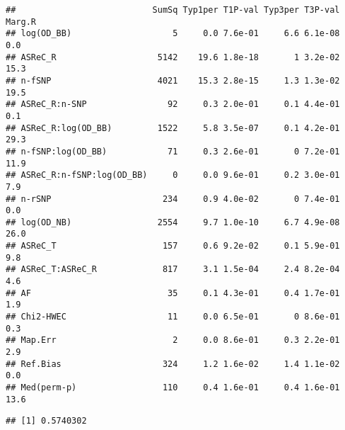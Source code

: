 \documentclass[]{article}
\newenvironment{Shaded}{\begin{snugshade}}{\end{snugshade}}
\newcommand{\KeywordTok}[1]{\textcolor[rgb]{0.13,0.29,0.53}{\textbf{#1}}}
\newcommand{\DataTypeTok}[1]{\textcolor[rgb]{0.13,0.29,0.53}{#1}}
\newcommand{\StringTok}[1]{\textcolor[rgb]{0.31,0.60,0.02}{#1}}
\newcommand{\OperatorTok}[1]{\textcolor[rgb]{0.81,0.36,0.00}{\textbf{#1}}}
\newcommand{\NormalTok}[1]{#1}
\begin{document}
\begin{Shaded}
\end{Shaded}

\begin{verbatim}
##                           SumSq Typ1per T1P-val Typ3per T3P-val Marg.R
## log(OD_BB)                    5     0.0 7.6e-01     6.6 6.1e-08    0.0
## ASReC_R                    5142    19.6 1.8e-18       1 3.2e-02   15.3
## n-fSNP                     4021    15.3 2.8e-15     1.3 1.3e-02   19.5
## ASReC_R:n-SNP                92     0.3 2.0e-01     0.1 4.4e-01    0.1
## ASReC_R:log(OD_BB)         1522     5.8 3.5e-07     0.1 4.2e-01   29.3
## n-fSNP:log(OD_BB)            71     0.3 2.6e-01       0 7.2e-01   11.9
## ASReC_R:n-fSNP:log(OD_BB)     0     0.0 9.6e-01     0.2 3.0e-01    7.9
## n-rSNP                      234     0.9 4.0e-02       0 7.4e-01    0.0
## log(OD_NB)                 2554     9.7 1.0e-10     6.7 4.9e-08   26.0
## ASReC_T                     157     0.6 9.2e-02     0.1 5.9e-01    9.8
## ASReC_T:ASReC_R             817     3.1 1.5e-04     2.4 8.2e-04    4.6
## AF                           35     0.1 4.3e-01     0.4 1.7e-01    1.9
## Chi2-HWEC                    11     0.0 6.5e-01       0 8.6e-01    0.3
## Map.Err                       2     0.0 8.6e-01     0.3 2.2e-01    2.9
## Ref.Bias                    324     1.2 1.6e-02     1.4 1.1e-02    0.0
## Med(perm-p)                 110     0.4 1.6e-01     0.4 1.6e-01   13.6
\end{verbatim}

\begin{Shaded}
\end{Shaded}

\begin{verbatim}
## [1] 0.5740302
\end{verbatim}

\begin{Shaded}
\end{Shaded}
\end{document}
